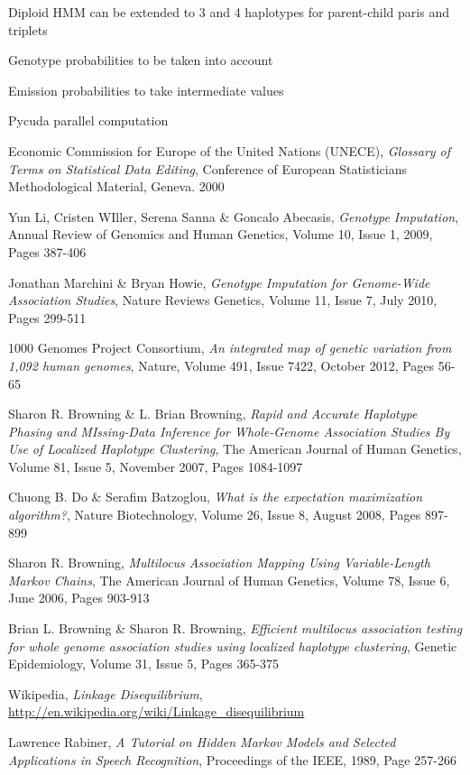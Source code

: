 \documentclass[a4paper,11pt,twoside,abstraction,titlepage]{article}
\begin{document}
Diploid HMM can be extended to 3 and 4 haplotypes for parent-child paris and triplets

Genotype probabilities to be taken into account

Emission probabilities to take intermediate values

Pycuda parallel computation

\newpage


\begin{thebibliography}{99}

 Economic Commission for Europe of the United Nations (UNECE), \emph{Glossary of Terms on Statistical Data Editing}, Conference of European Statisticians Methodological Material, Geneva. 2000

 Yun Li, Cristen WIller, Serena Sanna \& Goncalo Abecasis, \emph{Genotype Imputation}, Annual Review of Genomics and Human Genetics, Volume 10, Issue 1,  2009, Pages 387-406

 Jonathan Marchini \& Bryan Howie, \emph{Genotype Imputation for Genome-Wide Association Studies}, Nature Reviews Genetics, Volume 11, Issue 7, July 2010, Pages 299-511

 1000 Genomes Project Consortium, \emph{An integrated map of genetic variation from 1,092 human genomes}, Nature, Volume 491, Issue 7422, October 2012, Pages 56-65

 Sharon R. Browning \& L. Brian Browning, \emph{Rapid and Accurate Haplotype Phasing and MIssing-Data Inference for Whole-Genome Association Studies By Use of Localized Haplotype Clustering}, The American Journal of Human Genetics, Volume 81, Issue 5, November 2007, Pages 1084-1097

 Chuong B. Do \& Serafim Batzoglou, \emph{What is the expectation maximization algorithm?}, Nature Biotechnology, Volume 26, Issue 8, August 2008, Pages 897-899

 Sharon R. Browning, \emph{Multilocus Association Mapping Using Variable-Length Markov Chains}, The American Journal of Human Genetics, Volume 78, Issue 6, June 2006, Pages 903-913

 Brian L. Browning \& Sharon R. Browning, \emph{Efficient multilocus association testing for whole genome association studies using localized haplotype clustering},  Genetic Epidemiology, Volume 31, Issue 5, Pages 365-375

 Wikipedia, \emph{Linkage Disequilibrium}, \url{http://en.wikipedia.org/wiki/Linkage_disequilibrium}

 Lawrence Rabiner, \emph{A Tutorial on Hidden Markov Models and Selected Applications in Speech Recognition}, Proceedings of the IEEE, 1989, Page 257-266




\end{thebibliography}
\end{document}
